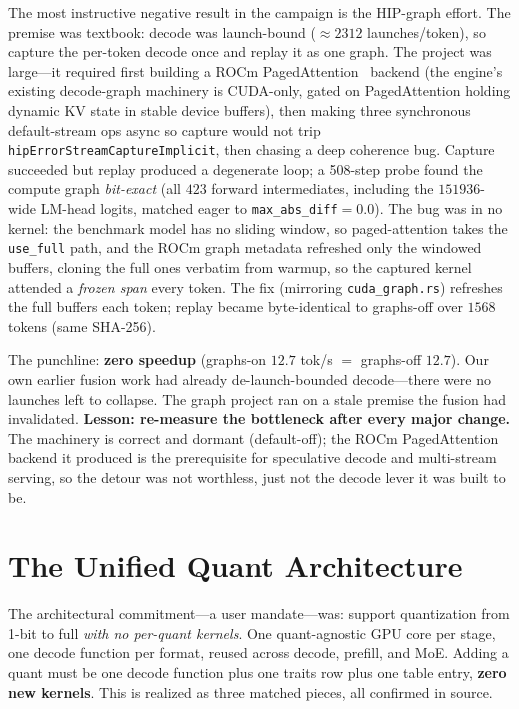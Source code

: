 \documentclass[11pt]{article}
\begin{document}
The most instructive negative result in the campaign is the HIP-graph effort. The premise was textbook: decode was launch-bound ($\approx 2312$ launches/token), so capture the per-token decode once and replay it as one graph. The project was large---it required first building a ROCm PagedAttention~\cite{kwon2023} backend (the engine's existing decode-graph machinery is CUDA-only, gated on PagedAttention holding dynamic KV state in stable device buffers), then making three synchronous default-stream ops async so capture would not trip \texttt{hipErrorStreamCaptureImplicit}, then chasing a deep coherence bug. Capture succeeded but replay produced a degenerate loop; a 508-step probe found the compute graph \emph{bit-exact} (all $423$ forward intermediates, including the $151936$-wide LM-head logits, matched eager to \texttt{max\_abs\_diff}$=0.0$). The bug was in no kernel: the benchmark model has no sliding window, so paged-attention takes the \texttt{use\_full} path, and the ROCm graph metadata refreshed only the windowed buffers, cloning the full ones verbatim from warmup, so the captured kernel attended a \emph{frozen span} every token. The fix (mirroring \texttt{cuda\_graph.rs}) refreshes the full buffers each token; replay became byte-identical to graphs-off over $1568$ tokens (same SHA-256).

The punchline: \textbf{zero speedup} (graphs-on $12.7$ tok/s $=$ graphs-off $12.7$). Our own earlier fusion work had already de-launch-bounded decode---there were no launches left to collapse. The graph project ran on a stale premise the fusion had invalidated. \textbf{Lesson: re-measure the bottleneck after every major change.} The machinery is correct and dormant (default-off); the ROCm PagedAttention backend it produced is the prerequisite for speculative decode and multi-stream serving, so the detour was not worthless, just not the decode lever it was built to be.

\section{The Unified Quant Architecture}
\label{sec:unified}

The architectural commitment---a user mandate---was: support quantization from 1-bit to full \emph{with no per-quant kernels}. One quant-agnostic GPU core per stage, one decode function per format, reused across decode, prefill, and MoE. Adding a quant must be one decode function plus one traits row plus one table entry, \textbf{zero new kernels}. This is realized as three matched pieces, all confirmed in source.
\end{document}
